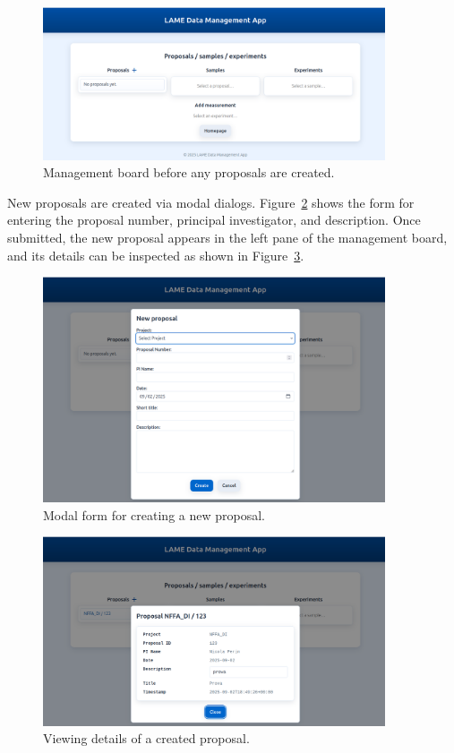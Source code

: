 \begin{figure}[!h]
	\centering
	\includegraphics[width=0.9\textwidth]{img/chpt5/ui_empty_board.png}
	\caption{Management board before any proposals are created.}
	\label{fig:ui-empty-board}
\end{figure}

\FloatBarrier
New proposals are created via modal dialogs. 
Figure~\ref{fig:ui-modal-proposal} shows the form for entering the proposal number, 
principal investigator, and description. 
Once submitted, the new proposal appears in the left pane of the management board, 
and its details can be inspected as shown in Figure~\ref{fig:ui-proposal-info}.

\begin{figure}[!h]
	\centering
	\includegraphics[width=0.9\textwidth]{img/chpt5/ui_modal_new_proposal.png}
	\caption{Modal form for creating a new proposal.}
	\label{fig:ui-modal-proposal}
\end{figure}

\begin{figure}[!h]
	\centering
	\includegraphics[width=0.9\textwidth]{img/chpt5/ui_proposal_info.png}
	\caption{Viewing details of a created proposal.}
	\label{fig:ui-proposal-info}
\end{figure}

